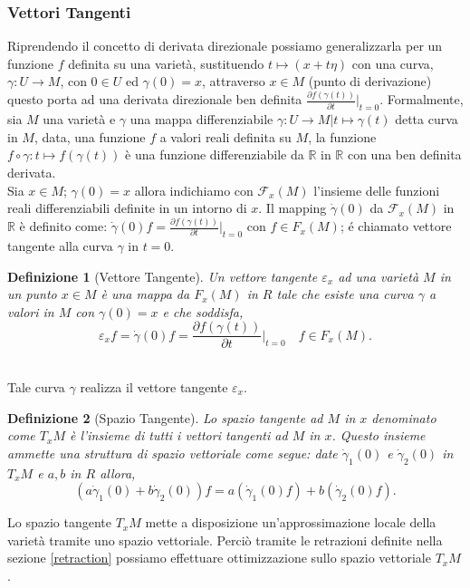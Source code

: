 \documentclass[a4paper, 12pt]{article}
\newtheorem{definition}{Definizione}
\begin{document}
\subsubsection{Vettori Tangenti}
Riprendendo il concetto di derivata direzionale possiamo generalizzarla per un funzione $f$ definita su una varietà, sustituendo $t \mapsto (x + t\eta)$ con una curva, $\gamma: U \to M$, con $0 \in U$ ed $\gamma (0) = x$, attraverso $x \in M$ (punto di derivazione) questo porta ad una derivata direzionale ben definita $\frac{\partial f(\gamma (t))}{\partial t} \vert_{t=0}$. Formalmente, sia $M$ una varietà e $\gamma$ una mappa differenziabile $\gamma : U \to M | t \mapsto \gamma (t)$ detta curva in $M$, data, una funzione $f$ a valori reali definita su $M$, la funzione $f \circ \gamma : t \mapsto f(\gamma (t))$ è una funzione differenziabile da $\mathbb{R}$ in $\mathbb{R}$ con una ben definita derivata.\\
Sia $x \in M$; $\gamma (0) = x$ allora indichiamo con $\mathcal{F}_{x}(M)$ l'insieme delle funzioni reali differenziabili definite in un intorno di $x$. Il mapping $\dot{\gamma} (0)$ da $\mathcal{F}_x(M)$ in $\mathbb{R}$ è definito come: $\dot{\gamma} (0) f = \frac{\partial f(\gamma (t))}{\partial t} \vert_{t=0}$ con $f \in F_x(M)$; é chiamato vettore tangente alla curva $\gamma$ in $t=0$.
\begin{definition}[Vettore Tangente]
Un vettore tangente $\varepsilon_x$ ad una varietà $M$ in un punto $x \in M$ è una mappa da $F_x(M)$ in $R$ tale che esiste una curva $\gamma$ a valori in $M$ con $\gamma (0) = x$ e che soddisfa,\\
\[\varepsilon_xf = \dot{\gamma} (0) f = \frac{\partial f(\gamma (t))}{\partial t} \vert_{t=0} \quad  f \in F_x(M).\]\\
\end{definition}
Tale curva $\gamma$ realizza il vettore tangente $\varepsilon_x$.
\begin{definition}[Spazio Tangente]
Lo spazio tangente ad $M$ in $x$ denominato come $T_xM$ è l'insieme di tutti i vettori tangenti ad $M$ in $x$. Questo insieme ammette una struttura di spazio vettoriale come segue: date $\dot{\gamma}_1 (0)$ e $\dot{\gamma}_2 (0)$ in $T_xM$ e $a, b$ in $R$ allora,\\
\[(a \dot{\gamma}_1 (0) + b \dot{\gamma}_2 (0)) f = a (\dot{\gamma}_1 (0) f) + b (\dot{\gamma}_2 (0) f).\]
\end{definition}
Lo spazio tangente $T_xM$ mette a disposizione un'approssimazione locale della varietà tramite uno spazio vettoriale. Perciò tramite le retrazioni definite nella sezione \ref{retraction} possiamo effettuare ottimizzazione sullo spazio vettoriale $T_xM$.
\end{document}
